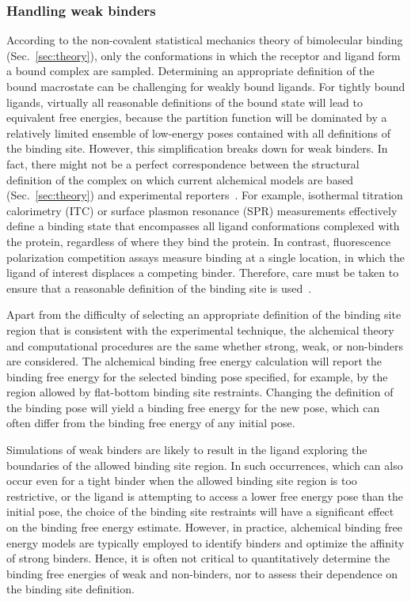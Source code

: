 \documentclass[9pt,bestpractices]{livecoms}
\begin{document}
\subsubsection{Handling weak binders}\label{sec:weak-binders}
According to the non-covalent statistical mechanics theory of bimolecular binding (Sec.~\ref{sec:theory}), only the conformations in which the receptor and ligand form a bound complex are sampled. Determining an appropriate definition of the bound macrostate can be challenging for weakly bound ligands. For tightly bound ligands, virtually all reasonable definitions of the bound state will lead to equivalent free energies, because the partition function will be dominated by a relatively limited ensemble of low-energy poses contained with all definitions of the binding site. However, this simplification breaks down for weak binders.  In fact, there might not be a perfect correspondence between the structural definition of the complex on which current alchemical models are based~\cite{gilson1997statisticalthermodynamic} (Sec.~\ref{sec:theory}) and experimental reporters~\cite{mihailescu2004theory}. For example, isothermal titration calorimetry (ITC) or surface plasmon resonance (SPR) measurements effectively define a binding state that encompasses all ligand conformations complexed with the protein, regardless of where they bind the protein. In contrast, fluorescence polarization competition assays measure binding at a single location, in which the ligand of interest displaces a competing binder. Therefore, care must be taken to ensure that a reasonable definition of the binding site is used~\cite{wang2013identifying}.

Apart from the difficulty of selecting an appropriate definition of the binding site region that is consistent with the experimental technique, the alchemical theory and computational procedures are the same whether strong, weak, or non-binders are considered. The alchemical binding free energy calculation will report the binding free energy for the selected binding pose specified, for example, by the region allowed by flat-bottom binding site restraints. Changing the definition of the binding pose will yield a binding free energy for the new pose, which can often differ from the binding free energy of any initial pose. 

Simulations of weak binders are likely to result in the ligand exploring the boundaries of the allowed binding site region. In such occurrences, which can also occur even for a tight binder when the allowed binding site region is too restrictive, or the ligand is attempting to access a lower free energy pose than the initial pose, the choice of the binding site restraints will have a significant effect on the binding free energy estimate. However, in practice, alchemical binding free energy models are typically employed to identify binders and optimize the affinity of strong binders. Hence, it is often not critical to quantitatively determine the binding free energies of weak and non-binders, nor to assess their dependence on the binding site definition.
\end{document}
